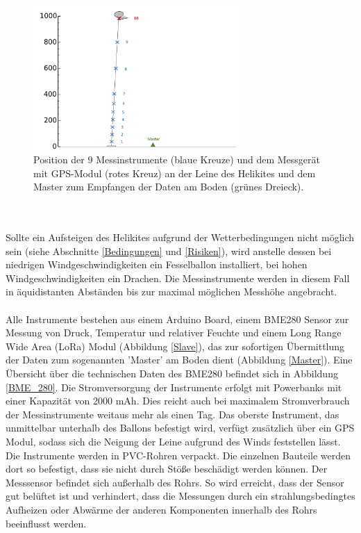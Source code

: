 \documentclass[a4paper,11pt,DIV=calc,tablecaptionabove,headinclude,twoside]{article}
\begin{document}
\begin{figure}[t]
\centering
\includegraphics[width=0.7\textwidth]{Helikite.png}
\captionsetup{width=11cm}
\caption{Position der 9 Messinstrumente (blaue Kreuze) und dem Messgerät mit GPS-Modul (rotes Kreuz) an der Leine des Helikites und dem Master zum Empfangen der Daten am Boden (grünes Dreieck). }
\label{helikite}
\end{figure}
\\\\
Sollte ein Aufsteigen des Helikites aufgrund der Wetterbedingungen nicht möglich sein (siehe Abschnitte \ref{Bedingungen} und \ref{Risiken}), wird anstelle dessen bei niedrigen Windgeschwindigkeiten ein Fesselballon installiert, bei hohen Windgeschwindigkeiten ein Drachen. Die Messinstrumente werden in diesem Fall in äquidistanten Abständen bis zur maximal möglichen Messhöhe angebracht. \\\\
Alle Instrumente bestehen aus einem Arduino Board, einem BME280 Sensor zur Messung von Druck, Temperatur und relativer Feuchte und einem Long Range Wide Area (LoRa) Modul (Abbildung \ref{Slave}), das zur sofortigen Übermittlung der Daten zum sogenannten 'Master' am Boden dient (Abbildung \ref{Master}). Eine Übersicht über die technischen Daten des BME280 befindet sich in Abbildung \ref{BME_280}. Die Stromversorgung der Instrumente erfolgt mit Powerbanks mit einer Kapazität von 2000 mAh. Dies reicht auch bei maximalem Stromverbrauch der Messinstrumente weitaus mehr als einen Tag. Das oberste Instrument, das unmittelbar unterhalb des Ballons befestigt wird, verfügt zusätzlich über ein GPS Modul, sodass sich die Neigung der Leine aufgrund des Winds feststellen lässt. Die Instrumente werden in PVC-Rohren verpackt. Die einzelnen Bauteile werden dort so befestigt, dass sie nicht durch Stöße beschädigt werden können. Der Messsensor befindet sich außerhalb des Rohrs. So wird erreicht, dass der Sensor gut belüftet ist und verhindert, dass die Messungen durch ein strahlungsbedingtes Aufheizen oder Abwärme der anderen Komponenten innerhalb des Rohrs beeinflusst werden.\\\\
\end{document}
